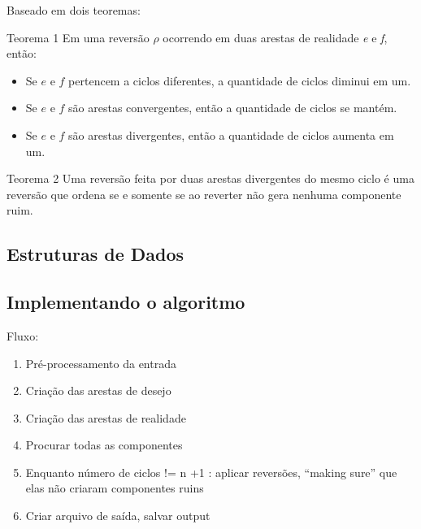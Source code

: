 \documentclass{beamer}
\begin{document}
\begin{frame}
	Baseado em dois teoremas:
	\begin{block} {Teorema 1}
		Em uma reversão $\rho$ ocorrendo em duas arestas de realidade \emph{e} e \emph{f}, então:
		\begin{itemize}
			\item Se $e$ e $f$ pertencem a ciclos diferentes, a quantidade de ciclos diminui em um.
			\item Se $e$ e $f$ são arestas convergentes, então a quantidade de ciclos se mantém.
			\item Se $e$ e $f$ são arestas divergentes, então a quantidade de ciclos aumenta em um.
		\end{itemize}
	\end{block}
	
	\begin{block} {Teorema 2}
		Uma reversão feita por duas arestas divergentes do mesmo ciclo é uma reversão que ordena se e somente se ao reverter não gera nenhuma componente ruim.
	\end{block}
\end{frame}

\subsection{Estruturas de Dados}

\begin{frame}

\end{frame}

\subsection{Implementando o algoritmo}

\begin{frame}
	Fluxo:

	\begin{enumerate}
		\item Pré-processamento da entrada
		\item Criação das arestas de desejo
		\item Criação das arestas de realidade
		\item Procurar todas as componentes
		\item Enquanto número de ciclos != n +1 :  aplicar reversões, “making sure” que elas não criaram componentes ruins
		\item Criar arquivo de saída, salvar output
	\end{enumerate}
\end{frame}
\end{document}

